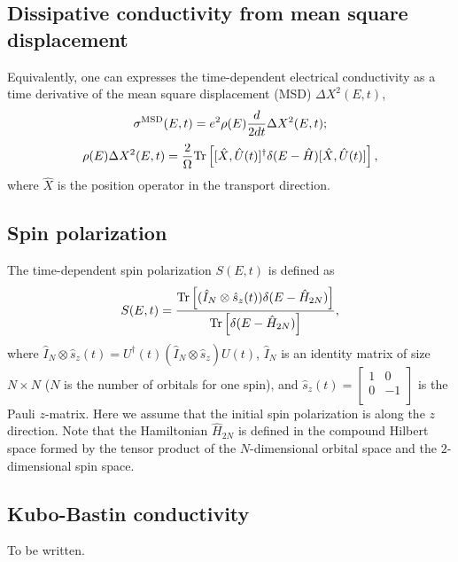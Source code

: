 \documentclass[12pt,a4paper]{report}
\begin{document}
\subsection{Dissipative conductivity from mean square displacement}

Equivalently, one can expresses the time-dependent electrical conductivity as a time derivative of the mean square displacement (MSD) $\Delta X^2(E, t)$,
\begin{equation}
\label{equation:REC_MSD}
\sigma^{\rm MSD}(E, t) = e^2 \rho(E) \frac{d}{2 d t}
            \Delta X^2(E, t);
\end{equation}
\begin{equation}
\rho(E)\Delta X^2(E, t) =\frac{2}{\Omega} 
\textmd{Tr}\left[[\hat{X}, \hat{U}(t)]^{\dagger}\delta(E - \hat{H}) [\hat{X}, \hat{U}(t)]\right],
\end{equation}
where $\hat{X}$ is the position operator in the transport direction. 


\subsection{Spin polarization}

The time-dependent spin polarization $S(E, t)$ is defined as
\begin{equation}
\label{equation:spin_polarization}
S(E, t) = 
\frac{\textmd{Tr}\left[ (\hat{I}_N \otimes \hat{s}_z(t)) \delta(E - \hat{H}_{2N}) \right]}
{\textmd{Tr}\left[ \delta(E - \hat{H}_{2N}) \right]},
\end{equation}
where $\hat{I}_N \otimes \hat{s}_z(t) = U^{\dagger}(t) (\hat{I}_N \otimes \hat{s}_z) U(t)$, $\hat{I}_N$ is an identity matrix of size $N\times N$ ($N$ is the number of orbitals for one spin), and $\hat{s}_z(t)=\begin{bmatrix} 1 & 0 \\0  &-1\\ \end{bmatrix}$  is the Pauli $z$-matrix. Here we assume that the initial spin polarization is along the $z$ direction. Note that the Hamiltonian $\hat{H}_{2N}$ is defined in the compound Hilbert space formed by the tensor product of the $N$-dimensional orbital space and the $2$-dimensional spin space. 

\subsection{Kubo-Bastin conductivity}

To be written.
\end{document}
